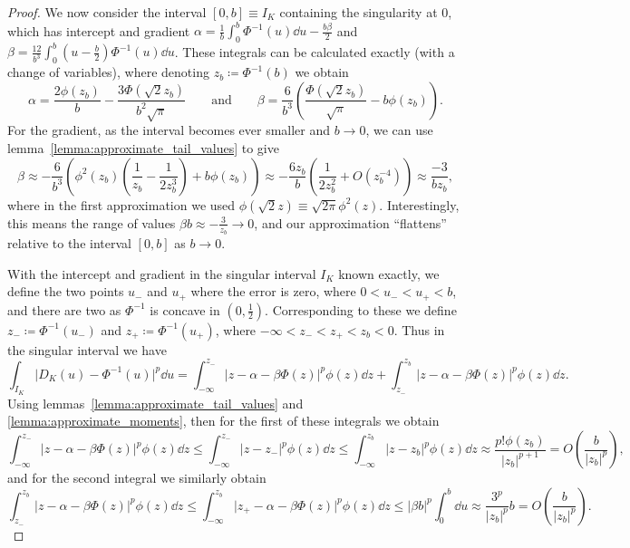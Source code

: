 \documentclass[manuscript,review]{acmart}
\begin{document}
\begin{proof}
We now consider the interval $ [0, b] \equiv I_K $ containing the singularity at 0, which has intercept and gradient
$ \alpha = \tfrac{1}{b} \int_{0}^{b} \Phi^{-1}(u) \dd{u} - \tfrac{b\beta}{2}  $
and 
$ \beta  = \tfrac{12}{b^3} \int_{0}^{b} (u - \tfrac{b}{2}) \Phi^{-1}(u) \dd{u} $.
These integrals can be calculated exactly (with a change of variables), where denoting $ z_b \coloneqq \Phi^{-1}(b) $ we obtain
\begin{equation*}
\alpha = \dfrac{2\phi(z_b)}{b} - \dfrac{3\Phi(\sqrt{2}z_b)}{b^2\sqrt{\pi}}
\qquad \text{and} \qquad 
\beta  = \dfrac{6}{b^3} \left(\dfrac{\Phi(\sqrt{2} z_b)}{\sqrt{\pi}} - b\phi(z_b)\right).
\end{equation*}
For the gradient, as the interval becomes ever smaller and $ b \to 0 $, we can use lemma~\ref{lemma:approximate_tail_values} to give
\begin{equation*}
\beta  
\approx -\dfrac{6}{b^3} \left(\phi^2(z_b)\left(\dfrac{1}{z_b} - \dfrac{1}{2 z_b^3}\right) + b \phi(z_b)\right)
\approx -\dfrac{6z_b}{b}\left(\dfrac{1}{2z_b^2} + O(z_b^{-4})\right)
\approx \dfrac{-3}{bz_b},
\end{equation*}
where in the first approximation we used  $ \phi(\sqrt{2}z) \equiv \sqrt{2\pi}\phi^2(z) $. Interestingly, this means the range of values $ \beta b \approx -\tfrac{3}{z_b} \to 0 $, and our approximation ``flattens'' relative to the interval $ [0, b] $ as $ b \to 0 $.

With the intercept and gradient in the singular interval $ I_K $ known exactly, we define the two points $ u_- $ and $ u_+ $ where the error is zero, where $ 0 < u_- < u_+ < b $, and there are two as $ \Phi^{-1} $ is concave in $ (0, \tfrac{1}{2}) $. Corresponding to these we define $ z_- \coloneqq \Phi^{-1}(u_-) $ and $ z_+ \coloneqq \Phi^{-1}(u_+) $, where $ -\infty < z_- < z_+ < z_b < 0 $. Thus in the singular interval we have
\begin{equation*}
\int_{I_K} \lvert D_K(u) - \Phi^{-1}(u)\rvert^p \dd{u} 
= \int_{-\infty}^{z_-} \lvert z - \alpha - \beta \Phi(z)\rvert^p \phi(z) \dd{z} + \int_{z_-}^{z_b} \lvert z - \alpha - \beta \Phi(z)\rvert^p \phi(z) \dd{z}.
\end{equation*}
Using lemmas~\ref{lemma:approximate_tail_values} and \ref{lemma:approximate_moments}, then for the first of these integrals we obtain
\begin{equation*}
\int_{-\infty}^{z_-} \lvert z - \alpha - \beta \Phi(z)\rvert^p \phi(z) \dd{z}
\leq \int_{-\infty}^{z_-} \lvert z - z_-\rvert^p \phi(z) \dd{z}
\leq \int_{-\infty}^{z_b} \lvert z - z_b\rvert^p \phi(z) \dd{z}
\approx  \dfrac{p!\phi(z_b)}{\lvert z_b\rvert^{p+1}}
=  O\left(\dfrac{b}{\lvert z_b \rvert^p}\right),
\end{equation*}
and for the second integral we similarly obtain
\begin{equation*}
\int_{z_-}^{z_b} \lvert z - \alpha - \beta \Phi(z)\rvert^p \phi(z) \dd{z}
\leq \int_{-\infty}^{z_b} \lvert z_+ - \alpha - \beta \Phi(z)\rvert^p \phi(z) \dd{z}
\leq \lvert \beta b \rvert^p \int_{0}^{b}\dd{u}
\approx \dfrac{3^p}{\lvert z_b\rvert^p} b
=  O\left(\dfrac{b}{\lvert z_b \rvert^p}\right).
\end{equation*}


\end{proof}
\end{document}
